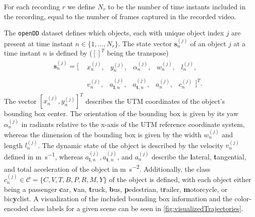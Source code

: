 \documentclass[a4paper, 10pt, conference]{ieeeconf}      %
\begin{document}
For each recording $r$ we define $N_r$ to be the number of time instants included in the recording, equal to the number of frames captured in the recorded video.

The \texttt{openDD} dataset defines which objects, each with unique object index $j$ are present at time instant \mbox{$n \in \{1, \dots, N_r\}$}.
The state vector $\mathbf{s}_{n}^{(j)}$ of an object $j$ at a time instant $n$ is defined by ($[]^T$ being the transpose)
\begin{equation}
  \begin{split}
    \mathbf{s}_{n}^{(j)} = [&\begin{matrix} x_{n}^{(j)}, & y_{n}^{(j)}, & \alpha_{n}^{(j)}, & w_{n}^{(j)}, & l_{n}^{(j)},\end{matrix} \\
    & \begin{matrix}v_{n}^{(j)}, & a_{\mathbf{l},n}^{(j)}, & a_{\mathbf{t},n}^{(j)}, & a_{n}^{(j)}, & c_{n}^{(j)}\end{matrix}]^T.
  \end{split}
\end{equation}
The vector $\left[x_{n}^{(j)}, y_{n}^{(j)}\right]^T$ describes the \gls{UTM} coordinates of the object's bounding box center.
The orientation of the bounding box is given by its yaw $\alpha_{n}^{(j)}$ in radiants relative to the x-axis of the \gls{UTM} reference coordinate system, whereas the dimension of the bounding box is given by the width $w_{n}^{(j)}$ and length $l_{n}^{(j)}$.
The dynamic state of the object is described by the velocity $v_n^{(j)}$ defined in \si{\meter\per\second}, whereas $a_{\mathbf{l},n}^{(j)}, a_{\mathbf{t},n}^{(j)}$, and $a_{n}^{(j)}$ describe the \textbf{l}ateral, \textbf{t}angential, and total acceleration of the object in \si{\meter\per\square\second}.
Additionally, the class $c_n^{(j)} \in \mathcal C = \{C, V, T, B, P, R, M, Y\}$ of the object is defined, with each object either being a passenger \textbf{c}ar, \textbf{v}an, \textbf{t}ruck, \textbf{b}us, \textbf{p}edestrian, t\textbf{r}ailer, \textbf{m}otorcycle, or bic\textbf{y}clist.
A visualization of the included bounding box information and the color-encoded class labels for a given scene can be seen in \autoref{fig:visualizedTrajectories}.

\end{document}
